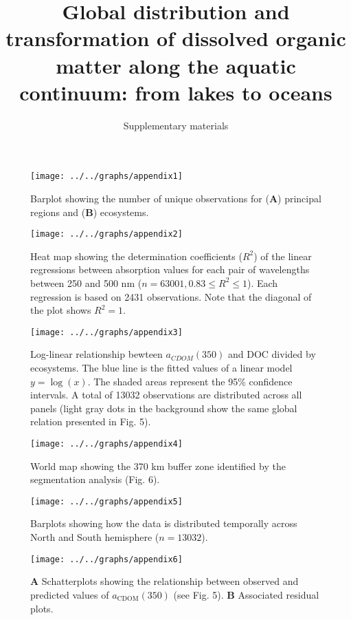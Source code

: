 \documentclass[12pt,a4paper]{scrartcl}
\title{Global distribution and transformation of dissolved organic matter along the aquatic continuum: from lakes to oceans}
\subtitle{Supplementary materials}
\date{}
\begin{document}
\maketitle

\begin{figure}[h]
	\centering
	\texttt{[image: ../../graphs/appendix1]}
	\caption{Barplot showing the number of unique observations for (\textbf{A}) principal regions and (\textbf{B}) ecosystems.}
\end{figure}

\clearpage
\newpage



\clearpage
\newpage

\begin{figure}[h]
	\centering
	\texttt{[image: ../../graphs/appendix2]}
	\caption{Heat map showing the determination coefficients ($R^2$) of the linear regressions between absorption values for each pair of wavelengths between 250 and 500 nm ($n = 63001, 0.83 \le R^2 \le 1$). Each regression is based on 2431 observations. Note that the diagonal of the plot shows $R^2 = 1$. }
\end{figure}

\clearpage
\newpage

\begin{figure}[h]
	\centering
	\texttt{[image: ../../graphs/appendix3]}

	\caption{Log-linear relationship bewteen $a_{CDOM}(350)$ and DOC divided by ecosystems. The blue line is the fitted values of a linear model $y = \log(x)$. The shaded areas represent the 95\% confidence intervals. A total of 13032 observations are distributed across all panels (light gray dots in the background show the same global relation presented in Fig. 5).}
\end{figure}

\clearpage
\newpage

\begin{figure}[h]
	\centering
	\texttt{[image: ../../graphs/appendix4]}
	\caption{World map showing the 370 km buffer zone identified by the segmentation analysis (Fig. 6).}
\end{figure}

\clearpage
\newpage

\begin{figure}[h]
	\centering
	\texttt{[image: ../../graphs/appendix5]}
	\caption{Barplots showing how the data is distributed temporally across North and South hemisphere ($n = 13032$).}
\end{figure}


\clearpage
\newpage

\begin{figure}[h]
	\centering
	\texttt{[image: ../../graphs/appendix6]}
	\caption{\textbf{A} Schatterplots showing the relationship between observed and predicted values of $a_{\text{CDOM}}(350)$ (see Fig. 5). \textbf{B} Associated residual plots.}
\end{figure}
\end{document}

